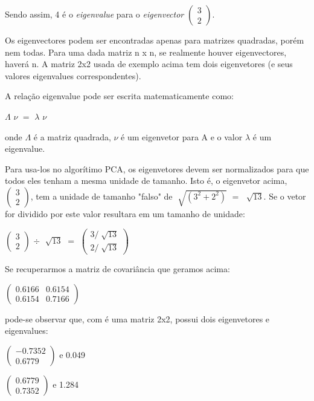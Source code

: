 Sendo assim, 4 é o \textit{eigenvalue} para o \textit{eigenvector}  $\begin{pmatrix} 3 \\ 2\end{pmatrix}$.

Os eigenvectores podem ser encontradas apenas para matrizes quadradas, porém nem todas. Para uma dada matriz n x n, se realmente houver eigenvectores, haverá n. A matriz 2x2 usada de exemplo acima tem dois eigenvetores (e seus valores eigenvalues correspondentes).

A relação eigenvalue pode ser escrita matematicamente como: 

 $\Lambda$ $\nu$  $=$  $\lambda$ $\nu$  

onde $\Lambda$ é a matriz quadrada, $\nu$ é um eigenvetor para A e o valor $\lambda$ é um eigenvalue.

Para usa-los no algorítimo PCA, os eigenvetores devem ser normalizados para que todos eles tenham a mesma unidade de tamanho. Isto é, o eigenvetor acima, $\begin{pmatrix} 3 \\ 2\end{pmatrix}$, tem a unidade de tamanho "falso"  de  $\sqrt[]{(3^2 + 2^2)}$ $=$ $\sqrt[]{13}$. Se o vetor for dividido por este valor resultara em um tamanho de unidade:

\begin{center}
	$\begin{pmatrix} 3 \\ 2 \end{pmatrix}$ 
	$\div$  
	$\sqrt[]{13}$ $=$ 
	$\begin{pmatrix} 3 / \sqrt[]{13} \\ 2/\sqrt[]{13} \end{pmatrix}$
\end{center}

Se recuperarmos a matriz de covariância que geramos acima:

\begin{center}
	$\begin{pmatrix} 0.6166 & 0.6154 \\ 0.6154 & 0.7166 \end{pmatrix}$
\end{center}

pode-se observar que, com é uma matriz 2x2, possui dois eigenvetores e eigenvalues:

\begin{center}
$\begin{pmatrix} -0.7352 \\ 0.6779 \end{pmatrix}$  e 0.049

$\begin{pmatrix} 0.6779 \\ 0.7352 \end{pmatrix}$  e 1.284
\end{center}

